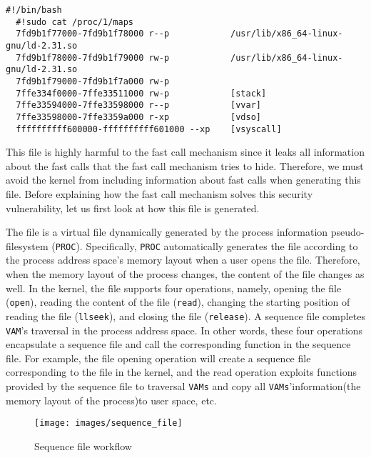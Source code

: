 \begin{lstlisting}[style=BASHStyle]
  #!/bin/bash
  #!sudo cat /proc/1/maps
  7fd9b1f77000-7fd9b1f78000 r--p            /usr/lib/x86_64-linux-gnu/ld-2.31.so
  7fd9b1f78000-7fd9b1f79000 rw-p            /usr/lib/x86_64-linux-gnu/ld-2.31.so
  7fd9b1f79000-7fd9b1f7a000 rw-p  
  7ffe334f0000-7ffe33511000 rw-p            [stack]
  7ffe33594000-7ffe33598000 r--p            [vvar]
  7ffe33598000-7ffe3359a000 r-xp            [vdso]
  ffffffffff600000-ffffffffff601000 --xp    [vsyscall]
\end{lstlisting}


This file is highly harmful to the fast call mechanism since 
it leaks all information about the fast calls that the fast call 
mechanism tries to hide. Therefore, we must avoid the kernel from 
including information about fast calls when generating this file. 
Before explaining how the fast call mechanism solves this security 
vulnerability, let us first look at how this file is generated.

The file is a virtual file dynamically generated by the process 
information pseudo-filesystem (\verb|PROC|). Specifically, \verb|PROC| automatically 
generates the file according to the process address space's memory 
layout when a user opens the file. Therefore, when the memory layout 
of the process changes, the content of the file changes as well. 
In the kernel, the file supports four operations, namely, opening 
the file (\verb|open|), reading the content of the file (\verb|read|), changing 
the starting position of reading the file (\verb|llseek|), and closing the 
file (\verb|release|). A sequence file completes \verb|VAM|'s traversal in the 
process address space. In other words, these four operations encapsulate 
a sequence file and call the corresponding function in the sequence file. 
For example, the file opening operation will create a sequence file 
corresponding to the file in the kernel, and the read operation exploits 
functions provided by the sequence file to traversal \verb|VAMs| and copy all 
\verb|VAMs|'information(the memory layout of the process)to user space, etc.
 
\begin{figure}[tbp]
  \centering
  \texttt{[image: images/sequence\_file]}
  \caption[Short description]{Sequence file workflow}
  \label{fig:sequence_file}
\end{figure}

